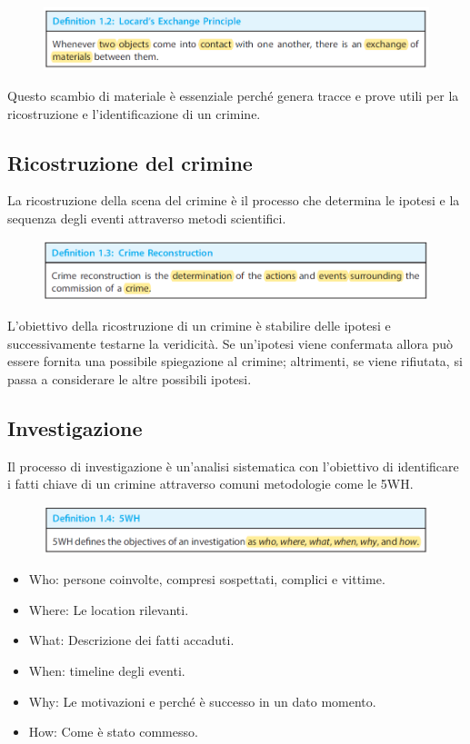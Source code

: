 \begin{figure}[h]
    \includegraphics[width=\textwidth]{Capitolo 1/Figure/locard-principle.png}
\end{figure}
Questo scambio di materiale è essenziale perché genera tracce e prove utili per la ricostruzione e l'identificazione di un crimine.

\subsection{Ricostruzione del crimine}
La ricostruzione della scena del crimine è il processo che determina le ipotesi e la sequenza degli eventi  attraverso metodi scientifici. 
\begin{figure}[h]
    \includegraphics[width=\textwidth]{Capitolo 1/Figure/crime-recostruction-def.png}
\end{figure}

L'obiettivo della ricostruzione di un crimine è stabilire delle ipotesi e successivamente testarne la veridicità. Se un'ipotesi viene confermata allora può essere fornita una possibile spiegazione al crimine; altrimenti, se viene rifiutata, si passa a considerare le altre possibili ipotesi.

\clearpage
\subsection{Investigazione}
Il processo di investigazione è un'analisi sistematica con l'obiettivo di identificare i fatti chiave di un crimine attraverso comuni metodologie come le 5WH.
\begin{figure}[h]
    \includegraphics[width=\textwidth]{Capitolo 1/Figure/5WH-def.png}
\end{figure}

\begin{itemize}
    \item Who: persone coinvolte, compresi sospettati, complici e vittime.
    \item Where: Le location rilevanti.
    \item What: Descrizione dei fatti accaduti.
    \item When: timeline degli eventi.
    \item Why: Le motivazioni e perché è successo in un dato momento.
    \item How: Come è stato commesso.
\end{itemize}

